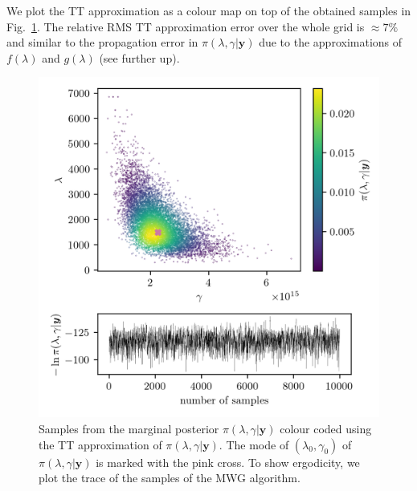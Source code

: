 We plot the TT approximation as a colour map on top of the obtained samples in Fig.~\ref{fig:ScatterPlotTT}.
The relative RMS TT approximation error over the whole grid is $\approx7\%$ and similar to the propagation error in $\pi(\lambda, \gamma| \bm{y})$ due to the approximations of $f(\lambda)$ and $g(\lambda)$ (see further up).
\begin{figure}[h!]
	\centering
	\includegraphics{ScatterplusHistoPlusTT.png}
	\caption[Samples from marginal posterior and TT approximation; trace plot of the MWG for $\pi(\lambda, \gamma| \bm{y})$]{Samples from the marginal posterior $\pi(\lambda , \gamma  | \bm{y})$ colour coded using the TT approximation of $\pi(\lambda , \gamma  | \bm{y})$. The mode of $(\lambda_0 , \gamma_0)$ of $\pi(\lambda , \gamma  | \bm{y})$ is marked with the pink cross. To show ergodicity, we plot the trace of the samples of the MWG algorithm.}
	\label{fig:ScatterPlotTT}
\end{figure}

